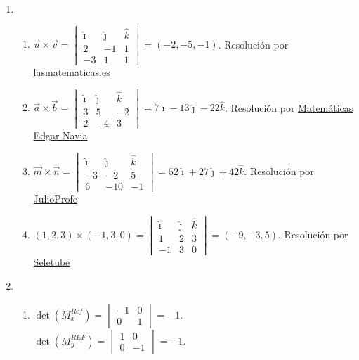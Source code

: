 \documentclass[a4paper]{article}
\newcommand{\exercise}{\item}
\begin{document}
\begin{enumerate}
\begin{enumerate} [label=(\alph*)]
		\item $\Delta=\lambda^2-7\lambda=0$ cuando $\lambda=0$ o $\lambda=7$. \\Con $\lambda=0$ y $\lambda=7$ es SI y con $\lambda\in\mathbb{R}-\{0,-7\}$ es SCD.
		\item Es SCD si $m\in \mathbb{R}-\{2,-3\}$. \\ Es SCI si $m=2$. Es SI si $m=-3$. Resolución por \href{https://youtu.be/jKLkTVmpmSk}{Cibermatex}.
		\item $\Delta=-\alpha^2-14\alpha-13=0$ cuando $\alpha=-1$ o $\alpha=-13$. \\Con $\alpha=-1$ y $\alpha=-13$ es SCI (como es homogéneo no puede ser SI) y con $\alpha\in\mathbb{R}-\{-1,-13\}$ es SCD.
\end{enumerate}\exercise\begin{enumerate} [label=(\alph*)]		\item $\vec{u} \times \vec{v}=\begin{vmatrix} \hat{\imath} & \hat{\jmath} & \hat{k} \\ 2 & -1 & 1 \\ -3 & 1 & 1\end{vmatrix}=(-2,-5,-1)$. Resolución por \href{https://youtu.be/P0aD2zSXuC8}{lasmatematicas.es}
		\item $\vec{a} \times \vec{b}=\begin{vmatrix} \hat{\imath} & \hat{\jmath} & \hat{k} \\ 3 & 5 & -2 \\ 2 & -4 & 3\end{vmatrix}=7\hat{\imath}-13\hat{\jmath}-22\hat{k}$. Resolución por \href{https://youtu.be/-JODKVdQ9H4}{Matemáticas Edgar Navia}
		\item $\vec{m} \times \vec{n}=\begin{vmatrix} \hat{\imath} & \hat{\jmath} & \hat{k} \\ -3 & -2 & 5 \\ 6 & -10 & -1\end{vmatrix}=52\hat{\imath}+27\hat{\jmath}+42\hat{k}$. Resolución por \href{https://youtu.be/fmAhi1N-uL8}{JulioProfe}
		\item $(1,2,3) \times (-1,3,0)=\begin{vmatrix} \hat{\imath} & \hat{\jmath} & \hat{k} \\ 1 & 2 & 3 \\ -1 & 3 & 0\end{vmatrix}=(-9,-3,5)$. Resolución por \href{https://youtu.be/_5MyVA6znPQ}{Seletube}
\end{enumerate}\exercise\begin{enumerate} [label=(\alph*)]		\item $\det(M^{Ref}_x)=\begin{vmatrix} -1 & 0 \\ 0 & 1 \end{vmatrix}=-1$. \\ $\det(M^{REF}_y)=\begin{vmatrix} 1 & 0 \\ 0 & -1 \end{vmatrix}=-1$.  

\end{enumerate}
\end{enumerate}
\end{document}
